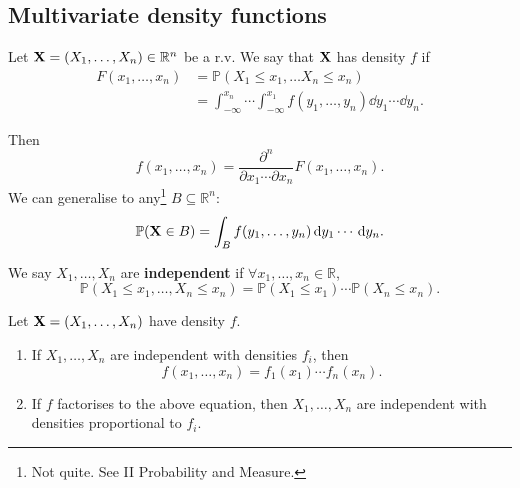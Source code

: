\subsection{Multivariate density functions}
\begin{definition}
    Let $ {\bf X} = (X_1,\dots,X_n)\in \mathbb{R}^{n} $ be a r.v. We say that ${\bf X}$ has density $f$ if 
    \begin{align*}
        F(x_1,\dots,x_n) &= \mathbb{P}(X_1\le x_1,\dots X_n\le x_n)\\ &= \int_{-\infty}^{x_n} \cdots \int_{-\infty}^{x_1} f(y_1,\dots,y_n)\dd y_1\cdots\dd y_n.
    \end{align*}
\end{definition}
\begin{note}
    Then 
    \[
        f(x_1,\dots,x_n) = \frac{\partial^n }{\partial x_1 \cdots \partial x_n}F(x_1,\dots,x_n). 
    \]
    We can generalise to any\footnote{Not quite. See II Probability and Measure.} $ B \subseteq \mathbb{R}^{n} $: 
    \[
        \mathbb{P}({\bf X}\in B) = \int_B f(y_1,\dots,y_n)\,\mathrm{d} y_1\cdots\,\mathrm{d} y_n.
    \]
\end{note}
\begin{definition}[Independence]
    We say $X_1,\dots,X_n$ are \textbf{independent} if $ \forall x_1,\dots,x_n\in \mathbb{R} $, 
    \[
        \mathbb{P}(X_1\le x_1,\dots, X_n\le x_n) = \mathbb{P}(X_1\le x_1)\cdots \mathbb{P}(X_n\le x_n).
    \]
\end{definition}
\begin{theorem}\label{thm:3.9}
    Let $ {\bf X} = (X_1,\dots,X_n) $ have density $f$.
    \begin{enumerate}
        \item If $ X_1,\dots,X_n $ are independent with densities $ f_i $, then 
        \[
            f(x_1,\dots,x_n)=f_1(x_1) \cdots f_n(x_n).
        \]
        \item If $f$ factorises to the above equation, then $ X_1,\dots,X_n $ are independent with densities proportional to $ f_i $.
    \end{enumerate}
\end{theorem}
